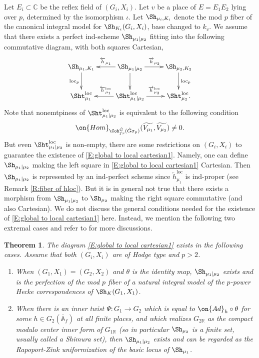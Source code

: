 \documentclass[11pt]{amsart}
\newtheorem{thm}{Theorem}[subsection]
\theoremstyle{definition}
\theoremstyle{definition}
\theoremstyle{definition}
\numberwithin{equation}{subsection}
\newcommand{\bA}{{\mathbb A}}
\newcommand{\bC}{{\mathbb C}}
\newcommand{\bR}{{\mathbb R}}
\newcommand{\Ad}{{\on{Ad}}}
\newcommand{\Hom}{{\on{Hom}}}
\newcommand{\loc}{\mathrm{loc}}
\begin{document}
Let $E_i\subset \bC$ be the reflex field of $(G_i,X_i)$. Let $v$ be a place of $E=E_1E_2$ lying over $p$, determined by the isomorphism $\iota$. 
Let $\Sh_{\mu_i,K_i}$ denote the mod $p$ fiber of the canonical integral model for $\Sh_{K_i}(G_i,X_i)$, base changed to $k_{v}$. 
We assume that there exists a perfect ind-scheme $\Sh_{\mu_1|\mu_2}$ fitting into the following commutative diagram, with both squares Cartesian,
\begin{equation}
\label{E:global to local cartesian1}
\xymatrix{
\Sh_{\mu_1,K_1} \ar_{\loc_p}[d] & \ar_{\overleftarrow{h}_{\mu_1}}[l] \Sh_{\mu_1|\mu_2} \ar^{\overrightarrow{h}_{\mu_2}}[r] \ar[d] & \Sh_{\mu_2,K_2} \ar^{\loc_p}[d] \\
\Sht_{\mu_1}^\loc & \ar_{\overleftarrow{h}_{\mu_1}^\loc}[l] \Sht_{\mu_1|\mu_2}^{\loc} \ar^{\overrightarrow{h}_{\mu_2}^\loc}[r]& \Sht_{\mu_2}^\loc.
}
\end{equation}
Note that nonemtpiness of $\Sht_{\mu_1\mid\mu_2}^\loc$ is equivalent to the following condition
\begin{equation}
\label{E: exotic p}
\Hom_{\Coh^{\hat G}_{fr}(\hat G\sigma_p)}(\widetilde{V_{\mu_1}},\widetilde{V_{\mu_2}})\neq 0.
\end{equation}
But even $\Sht_{\mu_1\mid\mu_2}^\loc$ is non-empty, there are some restrictions on $(G_i,X_i)$ to guarantee the existence of \eqref{E:global to local cartesian1}.  Namely, one can define $\Sh_{\mu_1\mid\mu_2}$ making the left square in \eqref{E:global to local cartesian1} Cartesian. Then $\Sh_{\mu_1\mid\mu_2}$ is represented by an ind-perfect scheme since $\overleftarrow{h}^\loc_{\mu_1}$ is ind-proper (see Remark \ref{R:fiber of hloc}). But it is in general not true that there exists a morphism from $\Sh_{\mu_1\mid\mu_2}$ to $\Sh_{\mu_2}$ making the right square commutative (and also Cartesian). We do not discuss the general conditions needed for the existence of \eqref{E:global to local cartesian1} here. Instead, we mention the following two extremal cases and refer to \cite{XZ} for more discussions.


\begin{thm}
\label{T: corr. Shimura}
The diagram \eqref{E:global to local cartesian1} exists in the following cases. Assume that both $(G_i,X_i)$ are of Hodge type and $p>2$.
\begin{enumerate}
\item
When $(G_1,X_1)=(G_2,X_2)$ and $\theta$ is the identity map, $\Sh_{\mu_1\mid \mu_2}$ exists and is the perfection of the mod $p$ fiber of a natural integral model of the $p$-power Hecke correspondences of $\Sh_K(G_1,X_1)$.
\item
When there is an inner twist $\Psi: G_1\to G_2$ which is equal to $\Ad_h \circ \theta$ for some $h\in G_2(\overline{\bA}_f)$ at all finite places, and which realizes $G_{2\bR}$ as the compact modulo center inner form of $G_{1\bR}$ (so in particular $\Sh_{\mu_2}$ is a finite set, usually called a Shimura set), then $\Sh_{\mu_1\mid \mu_2}$ exists and can be regarded as the Rapoport-Zink uniformization of the basic locus of $\Sh_{\mu_1}$.
\end{enumerate}
\end{thm}
\end{document}

